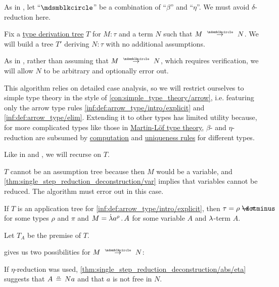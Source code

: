 \begin{algorithm}\label{alg:simply_typed_reduction}
  As in , let \enquote{\( {\Anon} \)} be a combination of \enquote{\( \beta \)} and \enquote{\( \eta \)}. We must avoid \( \delta \)-reduction here.

  Fix a \hyperref[def:type_derivation_tree]{type derivation tree} \( T \) for \( M: \tau \) and a term \( N \) such that \( M \pred N \). We will build a tree \( T' \) deriving \( N: \tau \) with no additional assumptions.

  As in , rather than assuming that \( M \pred N \), which requires verification, we will allow \( N \) to be arbitrary and optionally error out.

  This algorithm relies on detailed case analysis, so we will restrict ourselves to simple type theory in the style of \cref{con:simple_type_theory/arrow}, i.e. featuring only the arrow type rules \ref{inf:def:arrow_type/intro/explicit} and \ref{inf:def:arrow_type/elim}. Extending it to other types has limited utility because, for more complicated types like those in \hyperref[def:martin_lof_type_theory]{Martin-L\"of type theory}, \( \beta \)- and \( \eta \)-reduction are subsumed by \hyperref[rem:type_theory_rule_classification/equality/comp]{computation} and \hyperref[rem:type_theory_rule_classification/equality/uniq]{uniqueness rules} for different types.

  Like in  and , we will recurse on \( T \).

  \begin{thmenum}
     \( T \) cannot be an assumption tree because then \( M \) would be a variable, and \cref{thm:single_step_reduction_deconstruction/var} implies that variables cannot be reduced. The algorithm must error out in this case.

     If \( T \) is an application tree for \ref{inf:def:arrow_type/intro/explicit}, then \( \tau = \rho \synimplies \pi \) for some types \( \rho \) and \( \pi \) and \( M = \qabs {a^\rho} A \) for some variable \( A \) and \( {\mathrm \lambda} \)-term \( A \).

    Let \( T_A \) be the premise of \( T \).

     gives us two possibilities for \( M \pred N \):
    \begin{thmenum}
       If \( \eta \)-reduction was used, \cref{thm:single_step_reduction_deconstruction/abs/eta} suggests that \( A \aequiv Na \) and that \( a \) is not free in \( N \).


\end{thmenum}
\end{thmenum}
\end{algorithm}
